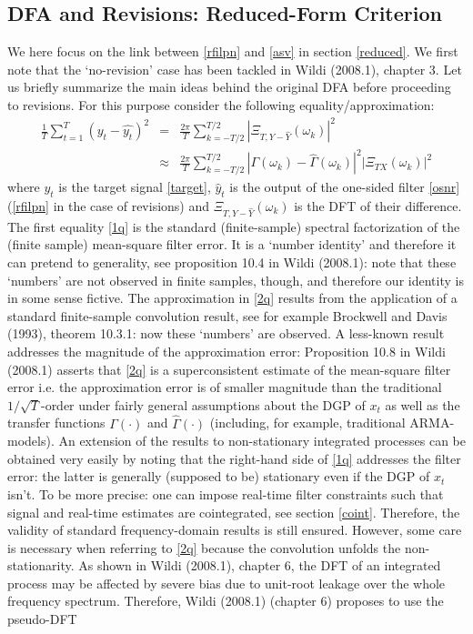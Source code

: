 \documentclass[11pt]{article}
\begin{document}
\subsection{DFA and Revisions: Reduced-Form Criterion }

We here focus on the link between \ref{rfilpn} and \ref{asv} in section \ref{reduced}. We first note that the `no-revision' case has been tackled in Wildi (2008.1), chapter 3. Let us briefly summarize the main ideas behind the original DFA before proceeding to revisions. For this purpose consider the following equality/approximation:
\begin{eqnarray}
\frac{1}{T}\sum_{t=1}^T(y_t-\hat{y_t})^2&=&\frac{2\pi}{T}\sum_{k=-T/2}^{T/2}\left|\Xi_{T,Y-\hat{Y}}(\omega_k)\right|^2\label{1q}\\
&\approx&\frac{2\pi}{T}\sum_{k=-T/2}^{T/2}\left|\Gamma(\omega_k)-\hat{\Gamma}(\omega_k)\right|^2\left|\Xi_{TX}(\omega_k)\right|^2\label{2q}
\end{eqnarray}
where $y_t$ is the target signal \ref{target}, $\hat{y}_t$ is the output of the one-sided filter \ref{osnr} (\ref{rfilpn} in the case of revisions) and $\Xi_{T,Y-\hat{Y}}(\omega_k)$ is the DFT of their difference. The first equality \ref{1q} is the standard (finite-sample) spectral factorization of the (finite sample) mean-square filter error. It is a `number identity' and therefore it can pretend to generality, see proposition 10.4 in Wildi (2008.1): note that these `numbers' are not observed in finite samples, though, and therefore our identity is in some sense fictive. The approximation in \ref{2q} results from the application of a standard finite-sample convolution result, see for example Brockwell and Davis (1993), theorem 10.3.1: now these `numbers' are observed. A less-known result addresses the magnitude of the approximation error: Proposition 10.8 in Wildi (2008.1) asserts that \ref{2q} is a superconsistent estimate of the mean-square filter error i.e. the approximation error is of smaller magnitude than the traditional $1/\sqrt{T}$-order under fairly general assumptions about the DGP of $x_t$ as well as the transfer functions $\Gamma(\cdot)$ and $\hat{\Gamma}(\cdot)$ (including, for example, traditional ARMA-models). An extension of the results to non-stationary integrated processes can be obtained very easily by noting that the right-hand side of \ref{1q} addresses the filter error: the latter is generally (supposed to be) stationary even if the DGP of  $x_t$ isn't. To be more precise: one can impose real-time filter constraints such that signal and real-time estimates are cointegrated, see section \ref{coint}. Therefore, the validity of standard  frequency-domain results is still ensured. However, some care is necessary when referring to \ref{2q} because the convolution unfolds the non-stationarity. As shown in Wildi (2008.1), chapter 6, the DFT of an integrated process may be affected by severe bias due to unit-root leakage over the whole frequency spectrum. Therefore, Wildi (2008.1) (chapter 6) proposes to use the pseudo-DFT
\end{document}
